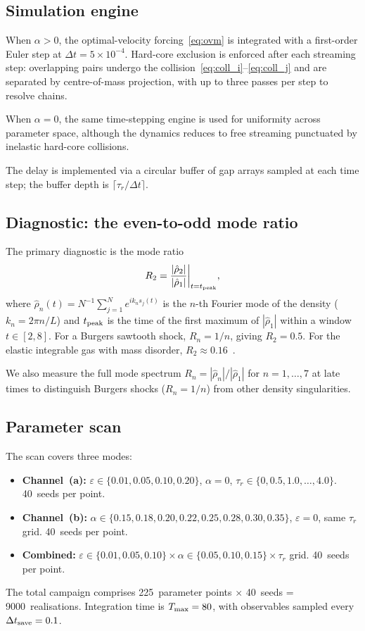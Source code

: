\documentclass[aps,pre,twocolumn,superscriptaddress,longbibliography,floatfix]{revtex4-2}
\begin{document}
\subsection{Simulation engine}

When $\alpha > 0$, the optimal-velocity forcing~\eqref{eq:ovm}
is integrated with a first-order Euler step at $\Delta t = 5
\times 10^{-4}$. Hard-core exclusion is enforced after each
streaming step: overlapping pairs undergo the
collision~\eqref{eq:coll_i}--\eqref{eq:coll_j} and are separated
by centre-of-mass projection, with up to three passes per step
to resolve chains.

When $\alpha = 0$, the same time-stepping engine is used for
uniformity across parameter space, although the dynamics reduces
to free streaming punctuated by inelastic hard-core collisions.

The delay is implemented via a circular buffer of gap arrays
sampled at each time step; the buffer depth is $\lceil \tau_r /
\Delta t \rceil$.

\subsection{Diagnostic: the even-to-odd mode ratio}

The primary diagnostic is the mode ratio
\begin{equation}
R_2 = \frac{|\hat\rho_2|}{|\hat\rho_1|}
\bigg|_{t = t_{\rm peak}},
\label{eq:R2}
\end{equation}
where $\hat\rho_n(t) = N^{-1}\sum_{j=1}^N e^{ik_n s_j(t)}$ is
the $n$-th Fourier mode of the density ($k_n = 2\pi n/L$) and
$t_{\rm peak}$ is the time of the first maximum of
$|\hat\rho_1|$ within a window $t \in [2, 8]$. For a Burgers
sawtooth shock, $R_n = 1/n$, giving $R_2 = 0.5$. For the
elastic integrable gas with mass disorder,
$R_2 \approx 0.16$~\cite{PaperVI}.

We also measure the full mode spectrum $R_n =
|\hat\rho_n|/|\hat\rho_1|$ for $n = 1, \ldots, 7$ at late times
to distinguish Burgers shocks ($R_n = 1/n$) from other density
singularities.

\subsection{Parameter scan}

The scan covers three modes:
\begin{itemize}
\item \textbf{Channel~(a):} $\varepsilon \in \{0.01, 0.05, 0.10,
0.20\}$, $\alpha = 0$, $\tau_r \in \{0, 0.5, 1.0, \ldots,
4.0\}$. 40~seeds per point.
\item \textbf{Channel~(b):} $\alpha \in \{0.15, 0.18, 0.20,
0.22, 0.25, 0.28, 0.30, 0.35\}$, $\varepsilon = 0$, same
$\tau_r$ grid. 40~seeds per point.
\item \textbf{Combined:} $\varepsilon \in \{0.01, 0.05, 0.10\}
\times \alpha \in \{0.05, 0.10, 0.15\} \times \tau_r$ grid.
40~seeds per point.
\end{itemize}
The total campaign comprises 225~parameter points $\times$
40~seeds = 9000~realisations.
Integration time is $T_{\rm max} = 80$, with observables sampled
every $\Delta t_{\rm save} = 0.1$.
\end{document}
